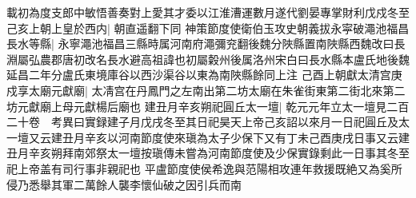 載初為度支郎中敏悟善奏對上愛其才委以江淮漕運數月遂代劉晏專掌財利戊戍冬至己亥上朝上皇於西内|{
	朝直遥翻下同}
神策節度使衛伯玉攻史朝義拔永寜破澠池福昌長水等縣|{
	永寧澠池福昌三縣時属河南府澠彌兖翻後魏分陜縣置南陜縣西魏改曰長淵屬弘農郡唐初改名長水避高祖諱也初屬糓州後属洛州宋白曰長水縣本盧氏地後魏延昌二年分盧氏東境庫谷以西沙渠谷以東為南陜縣餘同上注}
己酉上朝獻太清宫庚戍享太廟元獻廟|{
	太凊宫在丹鳳門之左南出第二坊太廟在朱雀街東第二街北來第二坊元獻廟上母元獻楊后廟也}
建丑月辛亥朔祀圓丘太一壇|{
	乾元元年立太一壇見二百二十卷　考異曰實録建子月戊戌冬至其日祀昊天上帝己亥詔以來月一日祀圓丘及太一壇又云建丑月辛亥以河南節度使來瑱為太子少保下又有丁未己酉庚戌日事又云建丑月辛亥朔拜南郊祭太一壇按瑱傳未嘗為河南節度使及少保實錄剩此一日事其冬至祀上帝盖有司行事非親祀也}
平盧節度使侯希逸與范陽相攻連年救援既絶又為奚所侵乃悉舉其軍二萬餘人襲李懷仙破之因引兵而南

